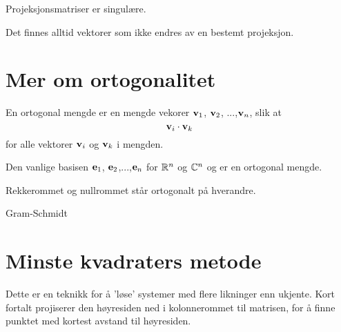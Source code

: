 \begin{thm}
Projeksjonsmatriser er singulære.
\end{thm}

\begin{thm}
Det finnes alltid vektorer som ikke endres av en bestemt projeksjon.
\end{thm}



\section*{Mer om ortogonalitet}
En ortogonal mengde er en mengde vekorer $\mathbf{v}_1$, $\mathbf{v}_2$, ...,$\mathbf{v}_n$, slik at
\[
\mathbf{v}_i \cdot \mathbf{v}_k
\]
for alle vektorer $\mathbf{v}_i$ og $\mathbf{v}_k$ i mengden. 
\begin{ex}
Den vanlige basisen $\mathbf{e}_1$, $\mathbf{e}_2$,...,$\mathbf{e}_n$ for $\mathbb{R}^n$ og $\mathbb{C}^n$ og  er en ortogonal mengde.
\end{ex}
\begin{ex}
Rekkerommet og nullrommet står ortogonalt på hverandre.
\end{ex}
\begin{ex}
Gram-Schmidt
\end{ex}

\section*{Minste kvadraters metode}
Dette er en teknikk for å 'løse' systemer med flere likninger enn ukjente. Kort fortalt projiserer den høyresiden ned i kolonnerommet til matrisen, for å finne punktet med kortest avstand til høyresiden.

\kapittelslutt
